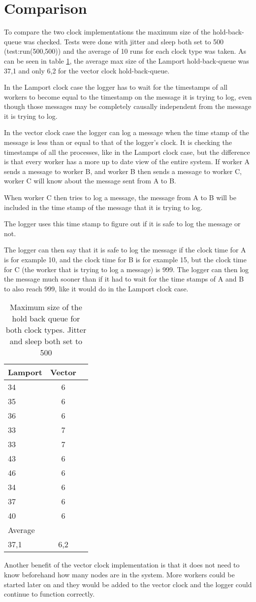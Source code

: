 \documentclass[a4paper, 11pt]{article}
\begin{document}
\section{Comparison}

To compare the two clock implementations the maximum size of the hold-back-queue was checked. Tests were done with jitter and sleep both set to 500 (test:run(500,500)) and the average of 10 runs for each clock type was taken. As can be seen in table \ref{tab:maxsizeofqueue}, the average max size of the Lamport hold-back-queue was 37,1 and only 6,2 for the vector clock hold-back-queue.

In the Lamport clock case the logger has to wait for the timestamps of all workers to become equal to the timestamp on the message it is trying to log, even though those messages may be completely causally independent from the message it is trying to log.

In the vector clock case the logger can log a message when the time stamp of the message is less than or equal to that of the logger's clock.
It is checking the timestamps of all the processes, like in the Lamport clock case, but the difference is that every worker has a more up to date view of the entire system. 
If worker A sends a message to worker B, and worker B then sends
a message to worker C, worker C will know about the message sent from A to B.

When worker C then tries to log a message, the message from A to B will be included in the time stamp of the message that it is trying to log. 

The logger uses this time stamp to figure out if it is safe to log the message or not.

The logger can then say that it is safe to log the message if the clock time for A is for example 10, and the clock time for B is for example 15, but the clock time for C (the worker that is trying to log a message) is 999.
The logger can then log the message much sooner than if it had to wait for the time stamps of A and B to also reach 999, like it would do in the Lamport clock case.

\begin{table}[h]
\centering
\begin{tabular}{lcc}
Lamport & Vector\\\hline
34 & 6\\\hline
35 & 6\\\hline
36 & 6\\\hline
33 & 7\\\hline
33 & 7\\\hline
43 & 6\\\hline
46 & 6\\\hline
34 & 6\\\hline
37 & 6\\\hline
40 & 6\\\hline
Average\\\hline
37,1 & 6,2\\\hline
\end{tabular}
\caption{Maximum size of the hold back queue for both clock types. Jitter and sleep both set to 500}
\label{tab:maxsizeofqueue}
\end{table}

Another benefit of the vector clock implementation is that it does not need to know beforehand how many nodes are in the system. More workers could be started later on and they would be added to the vector clock and the logger could continue to function correctly.
\end{document}
